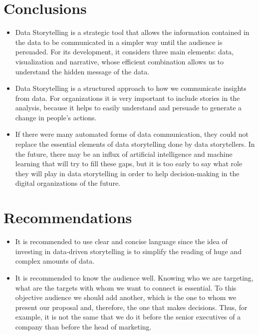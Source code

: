 \documentclass{article}
\begin{document}
\begin{multicols}{2}
\section{Conclusions}
\begin{itemize}
    \item Data Storytelling is a strategic tool that allows the information contained in the data to be communicated in a simpler way until the audience is persuaded. For its development, it considers three main elements: data, visualization and narrative, whose efficient combination allows us to understand the hidden message of the data.
    
    \item Data Storytelling is a structured approach to how we communicate insights from data. For organizations it is very important to include stories in the analysis, because it helps to easily understand and persuade to generate a change in people's actions.
    
    \item If there were many automated forms of data communication, they could not replace the essential elements of data storytelling done by data storytellers. In the future, there may be an influx of artificial intelligence and machine learning that will try to fill these gaps, but it is too early to say what role they will play in data storytelling in order to help decision-making in the digital organizations of the future.
    
\end{itemize}
 

\section{Recommendations}
\begin{itemize}
    \item It is recommended to use clear and concise language since the idea of investing in data-driven storytelling is to simplify the reading of huge and complex amounts of data.
    
    \item It is recommended to know the audience well. Knowing who we are targeting, what are the targets with whom we want to connect is essential. To this objective audience we should add another, which is the one to whom we present our proposal and, therefore, the one that makes decisions. Thus, for example, it is not the same that we do it before the senior executives of a company than before the head of marketing.
    
\end{itemize}
\end{multicols}
\newpage
\end{document}
